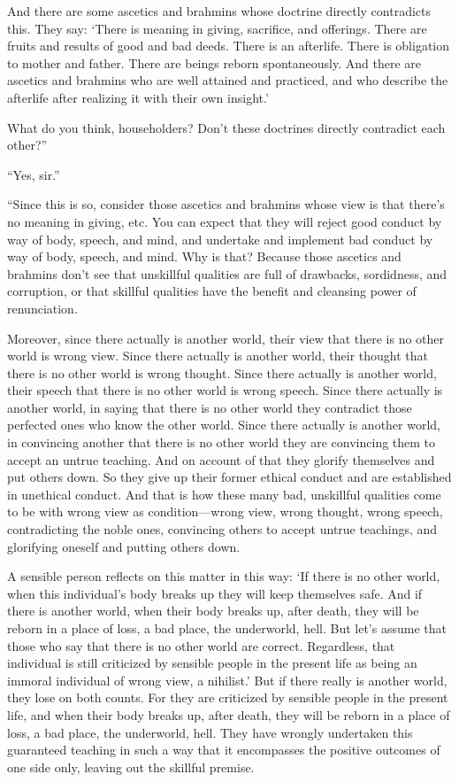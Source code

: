 \documentclass[12pt,openany]{book}%
\begin{document}
And there are some ascetics and brahmins whose doctrine directly contradicts this. They say: ‘There is meaning in giving, sacrifice, and offerings. There are fruits and results of good and bad deeds. There is an afterlife. There is obligation to mother and father. There are beings reborn spontaneously. And there are ascetics and brahmins who are well attained and practiced, and who describe the afterlife after realizing it with their own insight.’ 

What do you think, householders? Don’t these doctrines directly contradict each other?” 

“Yes, sir.” 

“Since this is so, consider those ascetics and brahmins whose view is that there’s no meaning in giving, etc. You can expect that they will reject good conduct by way of body, speech, and mind, and undertake and implement bad conduct by way of body, speech, and mind. Why is that? Because those ascetics and brahmins don’t see that unskillful qualities are full of drawbacks, sordidness, and corruption, or that skillful qualities have the benefit and cleansing power of renunciation. 

Moreover, since there actually is another world, their view that there is no other world is wrong view. Since there actually is another world, their thought that there is no other world is wrong thought. Since there actually is another world, their speech that there is no other world is wrong speech. Since there actually is another world, in saying that there is no other world they contradict those perfected ones who know the other world. Since there actually is another world, in convincing another that there is no other world they are convincing them to accept an untrue teaching. And on account of that they glorify themselves and put others down. So they give up their former ethical conduct and are established in unethical conduct. And that is how these many bad, unskillful qualities come to be with wrong view as condition—wrong view, wrong thought, wrong speech, contradicting the noble ones, convincing others to accept untrue teachings, and glorifying oneself and putting others down. 

A sensible person reflects on this matter in this way: ‘If there is no other world, when this individual’s body breaks up they will keep themselves safe. And if there is another world, when their body breaks up, after death, they will be reborn in a place of loss, a bad place, the underworld, hell. But let’s assume that those who say that there is no other world are correct. Regardless, that individual is still criticized by sensible people in the present life as being an immoral individual of wrong view, a nihilist.’ But if there really is another world, they lose on both counts. For they are criticized by sensible people in the present life, and when their body breaks up, after death, they will be reborn in a place of loss, a bad place, the underworld, hell. They have wrongly undertaken this guaranteed teaching in such a way that it encompasses the positive outcomes of one side only, leaving out the skillful premise. 
\end{document}
